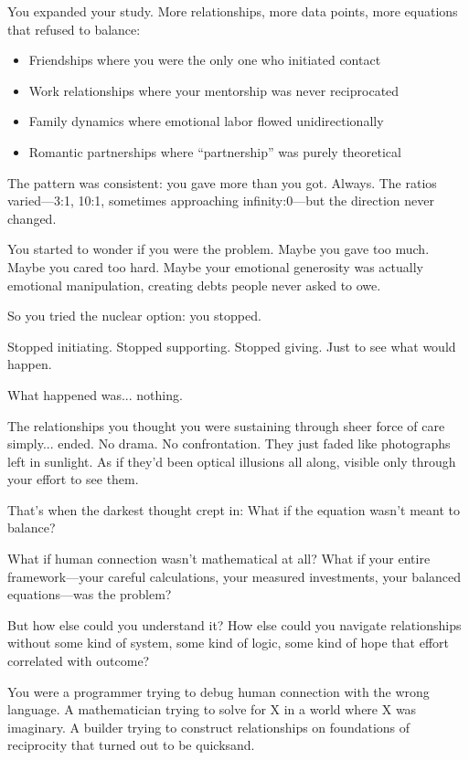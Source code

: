 \documentclass[12pt,letterpaper]{book}
\begin{document}
You expanded your study. More relationships, more data points, more equations that refused to balance:

\begin{itemize}
\item Friendships where you were the only one who initiated contact
\item Work relationships where your mentorship was never reciprocated
\item Family dynamics where emotional labor flowed unidirectionally
\item Romantic partnerships where ``partnership'' was purely theoretical
\end{itemize}

The pattern was consistent: you gave more than you got. Always. The ratios varied—3:1, 10:1, sometimes approaching infinity:0—but the direction never changed.

You started to wonder if you were the problem. Maybe you gave too much. Maybe you cared too hard. Maybe your emotional generosity was actually emotional manipulation, creating debts people never asked to owe.

So you tried the nuclear option: you stopped.

Stopped initiating. Stopped supporting. Stopped giving. Just to see what would happen.

What happened was... nothing.

The relationships you thought you were sustaining through sheer force of care simply... ended. No drama. No confrontation. They just faded like photographs left in sunlight. As if they'd been optical illusions all along, visible only through your effort to see them.

That's when the darkest thought crept in: What if the equation wasn't meant to balance?

What if human connection wasn't mathematical at all? What if your entire framework—your careful calculations, your measured investments, your balanced equations—was the problem?

But how else could you understand it? How else could you navigate relationships without some kind of system, some kind of logic, some kind of hope that effort correlated with outcome?

You were a programmer trying to debug human connection with the wrong language. A mathematician trying to solve for X in a world where X was imaginary. A builder trying to construct relationships on foundations of reciprocity that turned out to be quicksand.
\end{document}
